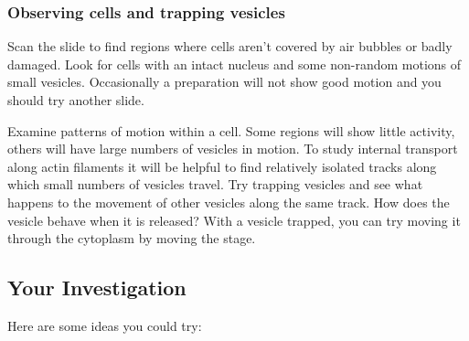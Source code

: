 \documentclass{../lab}
\begin{document}
\subsubsection{Observing cells and trapping vesicles}

Scan the slide to find regions where cells aren't covered by air bubbles or badly damaged. Look for cells with an intact nucleus and some non-random motions of small vesicles. Occasionally a preparation will not show good motion and you should try another slide.

Examine patterns of motion within a cell. Some regions will show little activity, others will have large numbers of vesicles in motion. To study internal transport along actin filaments it will be helpful to find relatively isolated tracks along which small numbers of vesicles travel. Try trapping vesicles and see what happens to the movement of other vesicles along the same track. How does the vesicle behave when it is released? With a vesicle trapped, you can try moving it through the cytoplasm by moving the stage.

\subsection{Your Investigation}

Here are some ideas you could try:
\end{document}
